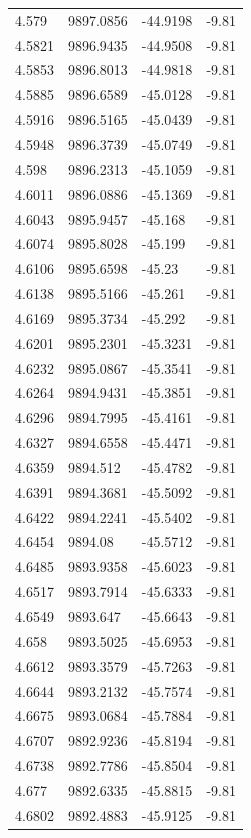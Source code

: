 \begin{table}[H]
\begin{tabular}{llll}
4.579 & 9897.0856 & -44.9198 & -9.81 \\
4.5821 & 9896.9435 & -44.9508 & -9.81 \\
4.5853 & 9896.8013 & -44.9818 & -9.81 \\
4.5885 & 9896.6589 & -45.0128 & -9.81 \\
4.5916 & 9896.5165 & -45.0439 & -9.81 \\
4.5948 & 9896.3739 & -45.0749 & -9.81 \\
4.598 & 9896.2313 & -45.1059 & -9.81 \\
4.6011 & 9896.0886 & -45.1369 & -9.81 \\
4.6043 & 9895.9457 & -45.168 & -9.81 \\
4.6074 & 9895.8028 & -45.199 & -9.81 \\
4.6106 & 9895.6598 & -45.23 & -9.81 \\
4.6138 & 9895.5166 & -45.261 & -9.81 \\
4.6169 & 9895.3734 & -45.292 & -9.81 \\
4.6201 & 9895.2301 & -45.3231 & -9.81 \\
4.6232 & 9895.0867 & -45.3541 & -9.81 \\
4.6264 & 9894.9431 & -45.3851 & -9.81 \\
4.6296 & 9894.7995 & -45.4161 & -9.81 \\
4.6327 & 9894.6558 & -45.4471 & -9.81 \\
4.6359 & 9894.512 & -45.4782 & -9.81 \\
4.6391 & 9894.3681 & -45.5092 & -9.81 \\
4.6422 & 9894.2241 & -45.5402 & -9.81 \\
4.6454 & 9894.08 & -45.5712 & -9.81 \\
4.6485 & 9893.9358 & -45.6023 & -9.81 \\
4.6517 & 9893.7914 & -45.6333 & -9.81 \\
4.6549 & 9893.647 & -45.6643 & -9.81 \\
4.658 & 9893.5025 & -45.6953 & -9.81 \\
4.6612 & 9893.3579 & -45.7263 & -9.81 \\
4.6644 & 9893.2132 & -45.7574 & -9.81 \\
4.6675 & 9893.0684 & -45.7884 & -9.81 \\
4.6707 & 9892.9236 & -45.8194 & -9.81 \\
4.6738 & 9892.7786 & -45.8504 & -9.81 \\
4.677 & 9892.6335 & -45.8815 & -9.81 \\
4.6802 & 9892.4883 & -45.9125 & -9.81 \\

\end{tabular}
\end{table}
